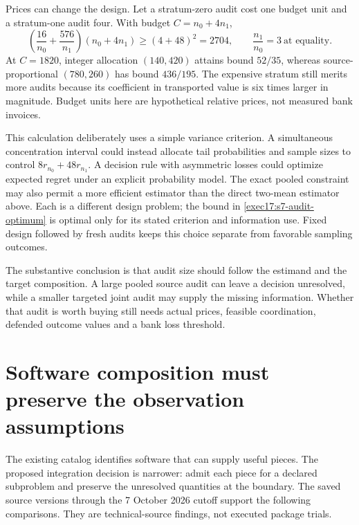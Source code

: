 Prices can change the design. Let a stratum-zero audit cost one budget unit
and a stratum-one audit four. With budget $C=n_0+4n_1$,
\begin{equation}
 \left(\frac{16}{n_0}+\frac{576}{n_1}\right)(n_0+4n_1)
 \geq(4+48)^2=2704,
 \qquad \frac{n_1}{n_0}=3\ \text{at equality}.
 \label{exec17:s7-priced-optimum}
\end{equation}
At $C=1820$, integer allocation $(140,420)$ attains bound $52/35$, whereas
source-proportional $(780,260)$ has bound $436/195$. The expensive stratum
still merits more audits because its coefficient in transported value is six
times larger in magnitude. Budget units here are hypothetical relative prices,
not measured bank invoices.

This calculation deliberately uses a simple variance criterion. A simultaneous
concentration interval could instead allocate tail probabilities and sample
sizes to control $8r_{n_0}+48r_{n_1}$. A decision rule with asymmetric losses
could optimize expected regret under an explicit probability model. The exact
pooled constraint may also permit a more efficient estimator than the direct
two-mean estimator above. Each is a different design problem; the bound in
\eqref{exec17:s7-audit-optimum} is optimal only for its stated criterion and
information use. Fixed design followed by fresh audits keeps this choice
separate from favorable sampling outcomes.

The substantive conclusion is that audit size should follow the estimand and
the target composition. A large pooled source audit can leave a decision
unresolved, while a smaller targeted joint audit may supply the missing
information. Whether that audit is worth buying still needs actual prices,
feasible coordination, defended outcome values and a bank loss threshold.

\section{Software composition must preserve the observation assumptions}
\label{exec17:s7-software}

The existing catalog identifies software that can supply useful pieces.
The proposed integration decision is narrower: admit each piece for a
declared subproblem and preserve the unresolved quantities at the boundary.
The saved source versions through the 7 October 2026 cutoff support the
following comparisons. They are technical-source findings, not executed
package trials.\citep{exec17_s7_paths}

